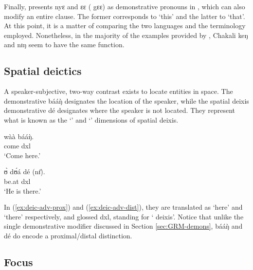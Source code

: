 \begin{exe}
\begin{exe}
\begin{exe}
\begin{exe}
\begin{exe}
\begin{exe}
\begin{exe}
\begin{exe}
\begin{exe}
\begin{exe}
\begin{exe}
\begin{exe}
Finally, \citet{mcgi99} presents  {\sls nyɛ} and {\sls ɛɛ} ( {\sls gɛɛ}) as demonstrative pronouns in , which can also modify an entire clause. The former corresponds to `this' and the latter to `that'. At this point, it is a matter of comparing the two languages and the terminology employed.  Nonetheless, in the majority of the examples provided by \citet{mcgi99}, Chakali {\sls keŋ} and {\sls nɪŋ} seem to have the same function. 


\subsection{Spatial deictics}
\label{sec:GRM-deic-adv}
 

A speaker-subjective,  two-way contrast  exists to locate entities in space. The  demonstrative  {\sls bááŋ̀} designates the location of the speaker, while the spatial deixis demonstrative  {\sls dé} designates  where the speaker is not located. They represent what is known as the `' and `' dimensions of spatial deixis.


\ea\label{ex:vp}
\ea\label{ex:deic-adv-prox}
\gll wàà  bááŋ̀.\\
  come {\sc dxl}\\
\glt  `Come here.'

 \ex\label{ex:deic-adv-dist}
\gll ʊ̀ dʊ́á dé (nɪ̄).\\
    {\psg}  be.at  {\sc dxl}  {\postp}\\
\glt  `He is there.'

\z 
 \z

  In (\ref{ex:deic-adv-prox}) and (\ref{ex:deic-adv-dist}),  they are translated as `here' and  `there' respectively, and glossed {\sc dxl}, standing for ` deixis'.  Notice that unlike the single demonstrative  modifier discussed in Section \ref{sec:GRM-demons},   {\sls bááŋ̀} and   {\sls dé}  do encode a proximal/distal distinction.

\subsection{Focus}
\label{sec:GRM-focus}



\end{exe}
\end{exe}
\end{exe}
\end{exe}
\end{exe}
\end{exe}
\end{exe}
\end{exe}
\end{exe}
\end{exe}
\end{exe}
\end{exe}
